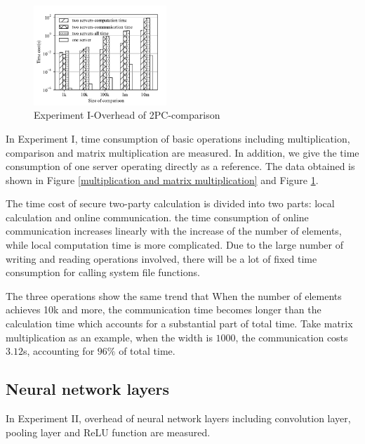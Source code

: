 \documentclass[letterpaper]{article} %
\begin{document}
    \begin{figure}[htbp]

        \centering
        \includegraphics[width=5cm]{operation_compare.pdf}
        \caption{Experiment I-Overhead of 2PC-comparison}
        \label{operation_compare}
    \end{figure}
    In Experiment I, time consumption of basic operations including multiplication, comparison and matrix multiplication are measured.
    In addition, we give the time consumption of one server operating directly as a reference.
    The data obtained is shown in Figure \ref{multiplication and matrix multiplication} and Figure \ref{operation_compare}. 
    
    The time cost of secure two-party calculation is divided into two parts: 
    local calculation and online communication. 
    the time consumption of online communication increases linearly with the increase of the number of elements, 
    while local computation time is more complicated. 
    Due to the large number of writing and reading operations involved, 
    there will be a lot of fixed time consumption for calling system file functions. 
    
    The three operations show the same trend that 
    When the number of elements achieves 10k and more, 
    the communication time becomes longer than the calculation time 
    which accounts for a substantial part of total time.
    Take matrix multiplication as an example, 
    when the width is $1000$, the communication costs $3.12$s, accounting for $96\%$ of total time.

    \subsection{Neural network layers}
    In Experiment II, overhead of neural network layers including 
    convolution layer, pooling layer and ReLU function are measured.
    
\end{document}
